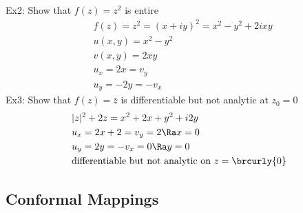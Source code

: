 Ex2: Show that $f(z)=z^2$ is entire
\begin{align*}
    &f(z)=z^2=(x+iy)^2=x^2-y^2+2ixy\\
    &u(x,y)=x^2-y^2\\
    &v(x,y)=2xy\\
    &u_x=2x=v_y\\
    &u_y=-2y=-v_x
\end{align*}
Ex3: Show that $f(z)=\bar{z}$ is differentiable but not analytic at $z_0=0$
\begin{align*}
    &|z|^2+2z=x^2+2x+y^2+i2y\\
    &u_x=2x+2=v_y=2\Ra x=0\\
    &u_y=2y=-v_x=0\Ra y=0\\
    &\text{differentiable but not analytic on }z=\brcurly{0}
\end{align*}

\subsection{Conformal Mappings}


